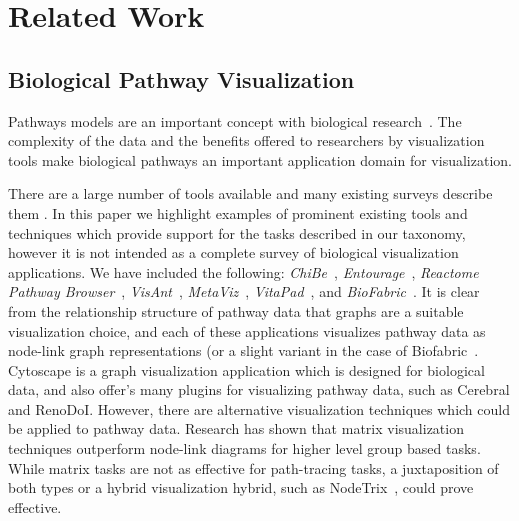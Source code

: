 \documentclass[journal]{vgtc}                %
\begin{document}
\section{Related Work}
\subsection{Biological Pathway Visualization}


Pathways models are an important concept with biological research~\cite{cairns2011regulation, luo2003targeting,reya2001stem}.
The complexity of the data and the benefits offered to researchers by visualization tools make biological pathways an important application domain for visualization.


There are a large number of tools available and many existing surveys describe them \cite{Suderman2007tools,pavlopoulos2008survey,Gehlenborg2010omics}.
In this paper we highlight examples of prominent existing tools and techniques which provide support for the tasks described in our taxonomy, however it is not intended as a complete survey of biological visualization applications.
We have included the following: \textit{ChiBe}~\cite{Babur2010chibe}, \textit{Entourage}~\cite{Lex2013entourage}, \textit{Reactome Pathway Browser}~\cite{croft2014reactome}, \textit{VisAnt}~\cite{hu2004visant}, \textit{MetaViz}~\cite{bourqui2007metabolic}, \textit{VitaPad}~\cite{holford2005vitapad}, and \textit{BioFabric}~\cite{Longabaugh2012biofabric}.
It is clear from the relationship structure of pathway data that graphs are a suitable visualization choice, and each of these applications visualizes pathway data as node-link graph representations (or a slight variant in the case of Biofabric~\cite{Longabaugh2012biofabric}.
Cytoscape \cite{cytoscape} is a graph visualization application which is designed for biological data, and also offer’s many plugins for visualizing pathway data, such as Cerebral\cite{Barsky2008cerebral} and RenoDoI\cite{Vehlow2015}.
However, there are alternative visualization techniques which could be applied to pathway data.
Research has shown that matrix visualization techniques outperform node-link diagrams for higher level group based tasks\cite{Ghoniem2004,Henry2007}.
While matrix tasks are not as effective for path-tracing tasks, a juxtaposition of both types or a hybrid visualization hybrid, such as NodeTrix~\cite{NodeTrix2007}, could prove effective.
\end{document}
